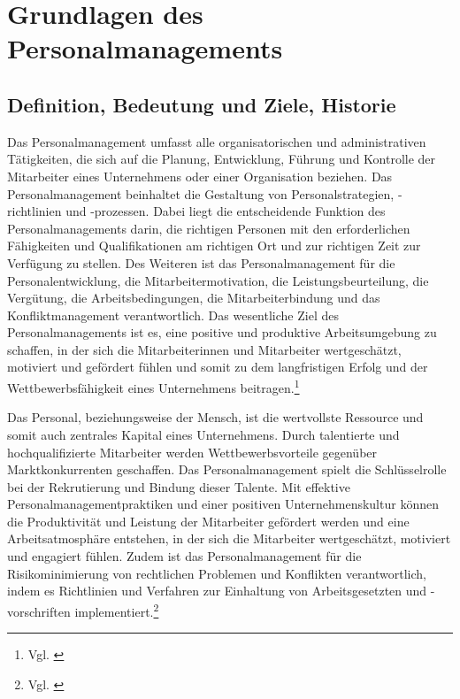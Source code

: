 

\section{Grundlagen des Personalmanagements} 
\label{sec:grundlagenpersonalmanagement}

\subsection{Definition, Bedeutung und Ziele, Historie}
\label{sec:gl_definition}
Das Personalmanagement umfasst alle organisatorischen und administrativen Tätigkeiten, die sich auf die Planung, Entwicklung, Führung und Kontrolle der Mitarbeiter eines Unternehmens oder einer Organisation beziehen. Das Personalmanagement beinhaltet die Gestaltung von Personalstrategien, -richtlinien und -prozessen. Dabei liegt die entscheidende Funktion des Personalmanagements darin, die richtigen Personen mit den erforderlichen Fähigkeiten und Qualifikationen am richtigen Ort und zur richtigen Zeit zur Verfügung zu stellen. Des Weiteren ist das Personalmanagement für die Personalentwicklung, die Mitarbeitermotivation, die Leistungsbeurteilung, die Vergütung, die Arbeitsbedingungen, die Mitarbeiterbindung und das Konfliktmanagement verantwortlich. Das wesentliche Ziel des Personalmanagements ist es, eine positive und produktive Arbeitsumgebung zu schaffen, in der sich die Mitarbeiterinnen und Mitarbeiter wertgeschätzt, motiviert und gefördert fühlen und somit zu dem langfristigen Erfolg und der Wettbewerbsfähigkeit eines Unternehmens beitragen.\footnote{Vgl. \cite{personio:PersoManagement}}

Das Personal, beziehungsweise der Mensch, ist die wertvollste Ressource und somit auch zentrales Kapital eines Unternehmens. Durch talentierte und hochqualifizierte Mitarbeiter werden Wettbewerbsvorteile gegenüber Marktkonkurrenten geschaffen. Das Personalmanagement spielt die Schlüsselrolle bei der Rekrutierung und Bindung dieser Talente. Mit effektive Personalmanagementpraktiken und einer positiven Unternehmenskultur können die Produktivität und Leistung der Mitarbeiter gefördert werden und eine Arbeitsatmosphäre entstehen, in der sich die Mitarbeiter wertgeschätzt, motiviert und engagiert fühlen. Zudem ist das Personalmanagement für die Risikominimierung von rechtlichen Problemen und Konflikten verantwortlich, indem es Richtlinien und Verfahren zur Einhaltung von Arbeitsgesetzten und -vorschriften implementiert.\footnote{Vgl. \cite{lernort-mint:PMBedeutungZiele}}

